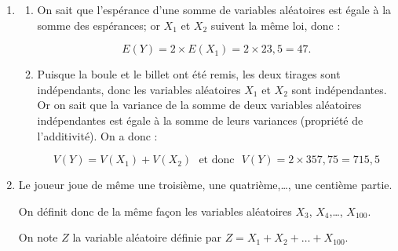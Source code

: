 \begin{enumerate}
L'espérance de $X_{1}$ est donc :
\[E\left(X_{1}\right) = 10 \times \np{0,6625} + 50 \times \np{0,3375} = 6,625 + 16,875 = \boxed{23,5}.\]

\smallskip

La variance de $X_{1}$ est donc :

\[\begin{aligned}
V\left(X_{1}\right)
& = E\left(X_{1}^{2}\right) - \left[E\left(X_{1}\right)\right]^{2} = \left (100 \times \np{0,6625} + \np{2500}\times \np{0,3375} \right )- 23,5^{2}\\
& = 66,25 + 843,75 - 552,25 = \boxed{357,75}.
\end{aligned}\]

\item
	\begin{enumerate}
		\item On sait que l'espérance d'une somme de variables aléatoires est égale à la somme des espérances; or $X_{1}$ et $X_{2}$ suivent la même loi, donc :

		\[E(Y) = 2 \times E\left(X_{1}\right) = 2 \times 23,5 = \boxed{47}.\]

		\item Puisque la boule et le billet ont été remis, les deux tirages sont indépendants, donc les variables aléatoires $X_{1}$ et $X_{2}$ sont indépendantes. Or on sait que la variance de la somme de deux variables aléatoires indépendantes est égale à la somme de leurs variances (propriété de l'additivité). On a donc :

\[\boxed{V(Y) = V\left(X_{1}\right) + V\left(X_{2}\right)} \text{~~et donc~~} \boxed{V(Y)=2\times 357,75 = 715,5}\]
	\end{enumerate}

\item Le joueur joue de même une troisième, une quatrième,\ldots, une centième partie.

On définit donc de la même façon les variables aléatoires $X_3$, $X_4$,\ldots, $X_{100}$.

On note $Z$ la variable aléatoire définie par $Z = X_1 + X_2 + \ldots + X_{100}$.



\end{enumerate}

